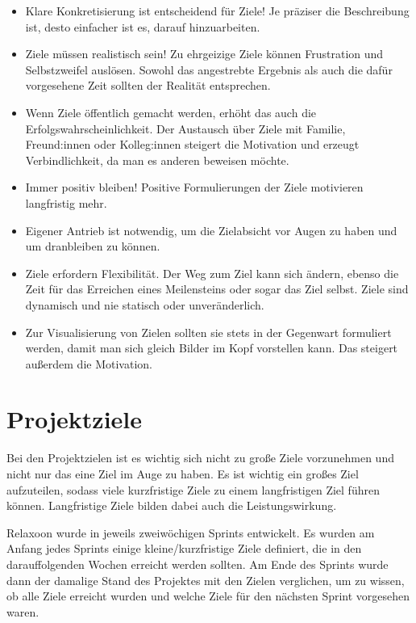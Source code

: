 \begin{itemize}
    \item Klare Konkretisierung ist entscheidend für Ziele! Je präziser die Beschreibung ist, desto einfacher
          ist es, darauf hinzuarbeiten.
    \item Ziele müssen realistisch sein! Zu ehrgeizige Ziele können Frustration und Selbstzweifel
          auslösen. Sowohl das angestrebte Ergebnis als auch die dafür vorgesehene Zeit sollten der Realität
          entsprechen.
    \item Wenn Ziele öffentlich gemacht werden, erhöht das auch die Erfolgswahrscheinlichkeit. Der Austausch
          über Ziele mit Familie, Freund:innen oder Kolleg:innen steigert die Motivation und erzeugt Verbindlichkeit, da
          man es anderen beweisen möchte.
    \item Immer positiv bleiben! Positive Formulierungen der Ziele motivieren langfristig mehr.
    \item Eigener Antrieb ist notwendig, um die Zielabsicht vor Augen zu haben und um dranbleiben zu
          können.
    \item Ziele erfordern Flexibilität. Der Weg zum Ziel kann sich ändern, ebenso die Zeit für das Erreichen
          eines Meilensteins oder sogar das Ziel selbst. Ziele sind dynamisch und nie statisch oder unveränderlich.
    \item Zur Visualisierung von Zielen sollten sie stets in der Gegenwart formuliert werden, damit man sich
          gleich Bilder im Kopf vorstellen kann. Das steigert außerdem die Motivation.
\end{itemize}

\section{Projektziele}


Bei den Projektzielen ist es wichtig sich nicht zu große Ziele vorzunehmen und nicht nur das eine Ziel im Auge zu haben.
Es ist wichtig ein großes Ziel aufzuteilen, sodass viele kurzfristige Ziele zu einem langfristigen Ziel führen können.
Langfristige Ziele bilden dabei auch die Leistungswirkung.

Relaxoon wurde in jeweils zweiwöchigen Sprints entwickelt. Es wurden am Anfang jedes Sprints einige 
kleine/kurzfristige Ziele definiert, die in den darauffolgenden Wochen erreicht werden sollten. Am Ende des 
Sprints wurde dann der damalige Stand des Projektes mit den Zielen verglichen, um zu wissen, ob alle Ziele 
erreicht wurden und welche Ziele für den nächsten Sprint vorgesehen waren.

